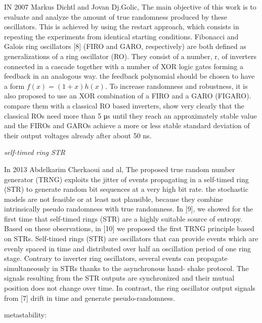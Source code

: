 IN 2007 Markus Dichtl and Jovan Dj.Golic, The main objective of this work is to evaluate and analyze the amount of true randomness produced by these oscillators. This is achieved by using the restart
approach, which consists in repeating the experiments from identical starting conditions. Fibonacci and Galois ring oscillators [8] (FIRO and GARO, respectively) are both defined as generalizations of a ring oscillator (RO). They consist of a number, r, of inverters connected in a cascade together with a number of XOR logic gates forming a feedback in an analogous way. the feedback polynomial should be chosen to have a form $f(x) = (1+x)h(x)$. To increase randomness and robustness, it is also proposed to use an
XOR combination of a FIRO and a GARO (FIGARO). compare them with a classical RO based inverters, show very clearly that the classical ROs need more than 5 μs until they reach an approximately stable value and the FIROs and GAROs achieve a more or less stable standard deviation of their output voltages already after about 50 ns. 

\textit{self-timed ring STR}

In 2013 Abdelkarim Cherkaoui and al, The proposed true random number generator (TRNG) exploits the jitter of events propagating in a self-timed ring (STR) to generate random bit sequences at a very high bit rate. the stochastic models are not feasible or at least not plausible, because they combine intrinsically pseudo randomness with true randomness. 
In [9], we showed for the first time that self-timed rings (STR) are a highly suitable source of entropy. Based on these observations, in [10] we proposed the first TRNG principle based on STRs. Self-timed rings (STR) are oscillators that can provide events which are evenly spaced in time and distributed over half an oscillation period of one ring stage. Contrary to inverter ring oscillators, several events can propagate simultaneously in STRs thanks to the asynchronous hand- shake protocol. The signals resulting from the STR outputs are synchronized and their mutual position does not change over time. In contrast, the ring oscillator output signals from [7] drift in time and generate pseudo-randomness.

metastability: